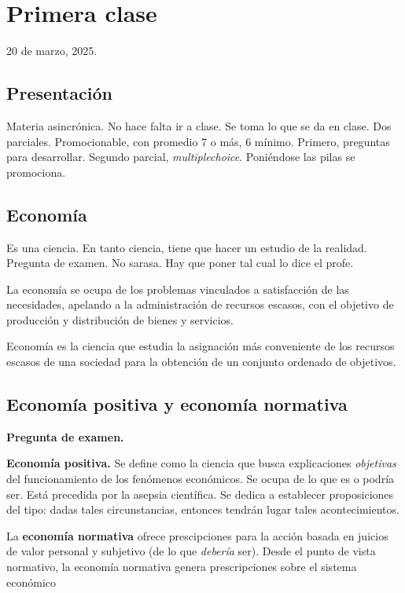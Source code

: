 \section{Primera clase}

20 de marzo, 2025.

\subsection{Presentación}

Materia asincrónica.
No hace falta ir a clase.
Se toma lo que se da en clase.
Dos parciales.
Promocionable, 
con promedio 7 o más,
6 mínimo.
Primero, preguntas para desarrollar.
Segundo parcial, \textit{multiplechoice}.
Poniéndose las pilas se promociona.

\subsection{Economía}

Es una ciencia.
En tanto ciencia, tiene que hacer un estudio de la realidad.
Pregunta de examen.
No sarasa.
Hay que poner tal cual lo dice el profe.

La economía se ocupa de los problemas vinculados a satisfacción de las necesidades,
apelando a la administración de recursos escasos,
con el objetivo de producción y distribución de bienes y servicios.

Economía es la ciencia que estudia la asignación más conveniente 
de los recursos escasos de una sociedad 
para la obtención de un conjunto ordenado de objetivos.

\subsection{Economía positiva y economía normativa}

\textbf{Pregunta de examen.}

\textbf{Economía positiva.}
Se define como
la ciencia que busca explicaciones \textit{objetivas} del funcionamiento de los fenómenos económicos.
Se ocupa de lo que es o podría ser.
Está precedida por la asepsia científica.
Se dedica a establecer proposiciones del tipo:
dadas tales circunstancias,
entonces tendrán lugar tales acontecimientos.

La \textbf{economía normativa} ofrece prescipciones para la acción
basada en juicios de valor personal y subjetivo
(de lo que \textit{debería} ser).
Desde el punto de vista normativo, 
la economía normativa genera prescripciones
sobre el sistema económico

